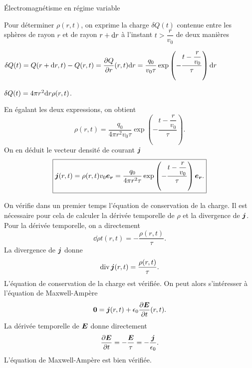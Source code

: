 \begin{corr}{Électromagnétisme en régime variable}
\begin{corrlist}
	\item Pour déterminer $\rho(r, t)$, on exprime la charge $\delta Q(t)$ contenue
	  entre les sphères de rayon $r$ et de rayon $r + \mathrm{d}r$ à l'instant 
	  $t > \dfrac{r}{v_0}$ de deux manières
	  \begin{corrlist}
		  \item $\delta Q(t) = Q(r + \mathrm{d}r, t) - Q(r, t) = \dfrac{\partial Q}{\partial r}(r, t) \mathrm{d}r
		  = \dfrac{q_0}{v_0 \tau} \exp\left(-\dfrac{t - \dfrac{r}{v_0}}
		  {\tau}\right) \mathrm{d}r$
	  	  \item $\delta Q(t) = 4 \pi r^2 \mathrm{d}r \rho(r, t)$.
	  \end{corrlist}
	  En égalant les deux expressions, on obtient
	  \begin{equation*}
		  \boxed{
		  \rho(r, t) = \dfrac{q_0}{4 \pi r^2 v_0 \tau}
		  \exp\left(-\dfrac{t - \dfrac{r}{v_0}} {\tau}\right).
	  }
	  \end{equation*}
	  On en déduit le vecteur densité de courant $\vecj$
	  \begin{equation*}
		  \boxed{
		  \vecj(r, t) = \rho(r, t) v_0 \er  = \dfrac{q_0}{4 \pi r^2 \tau}
		  \exp\left(-\dfrac{t - \dfrac{r}{v_0}} {\tau}\right) \er.
	  }
  	  \end{equation*}

  	\item On vérifie dans un premier temps l'équation de conservation de 
	  la charge. Il est nécessaire pour cela de calculer la dérivée temporelle
	  de $\rho$ et la divergence de $\vecj$. Pour la dérivée temporelle, 
	  on a directement
	  \begin{equation*}
		  \dd{\rho}{t}(r, t) = - \dfrac{\rho(r, t)}{\tau}.
	  \end{equation*}
	  La divergence de $\vecj$ donne
	  \begin{equation*}
		  \div \vecj(r, t) = \dfrac{\rho(r, t)}{\tau}.
	  \end{equation*}
	  L'équation de conservation de la charge est vérifiée. On peut alors
	  s'intéresser à l'équation de Maxwell-Ampère
	  \begin{equation*}
		  \vec{0} = \vecj(r, t) + \epsilon_0 \dd{\vece}{t}(r, t).
	  \end{equation*}
	  La dérivée temporelle de $\vece$ donne directement
	  \begin{equation*}
		  \dd{\vece}{t} = - \dfrac{\vece}{\tau} = - \dfrac{\vecj}{\epsilon_0}.
	  \end{equation*}
	  L'équation de Maxwell-Ampère est bien vérifiée.
	\end{corrlist}



\end{corr}
